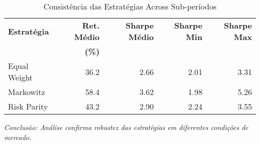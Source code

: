 \begin{table}[H]
\centering
\caption{Consistência das Estratégias Across Sub-períodos}
\begin{tabular}{|l|r|r|r|r|}
\hline
\textbf{Estratégia} & \textbf{Ret. Médio} & \textbf{Sharpe Médio} & \textbf{Sharpe Min} & \textbf{Sharpe Max} \\
& \textbf{(\%)} & & & \\
\hline
Equal Weight & 36.2 & 2.66 & 2.01 & 3.31 \\
\hline
Markowitz & 58.4 & 3.62 & 1.98 & 5.26 \\
\hline
Risk Parity & 43.2 & 2.90 & 2.24 & 3.55 \\
\hline
\end{tabular}

\textit{Conclusão: Análise confirma robustez das estratégias em diferentes condições de mercado.}
\label{tab:consistencia_estrategias}
\end{table}
